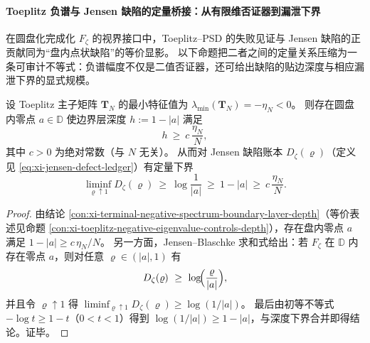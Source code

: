 \paragraph{Toeplitz 负谱与 Jensen 缺陷的定量桥接：从有限维否证器到漏泄下界}
在圆盘化完成化 \(F_\zeta\) 的视界接口中，Toeplitz--PSD 的失败见证与 Jensen 缺陷的正贡献同为“盘内点状缺陷”的等价显影。
以下命题把二者之间的定量关系压缩为一条可审计不等式：负谱幅度不仅是二值否证器，还可给出缺陷的贴边深度与相应漏泄下界的显式规模。

\begin{proposition}\label{prop:xi-toeplitz-negative-eigenvalue-implies-jensen-defect-lb}
设 Toeplitz 主子矩阵 \(\mathbf{T}_N\) 的最小特征值为 \(\lambda_{\min}(\mathbf{T}_N)=-\eta_N<0\)。
则存在圆盘内零点 \(a\in\mathbb{D}\) 使边界层深度 \(h:=1-|a|\) 满足
\[
h\ \ge\ c\,\frac{\eta_N}{N},
\]
其中 \(c>0\) 为绝对常数（与 \(N\) 无关）。
从而对 Jensen 缺陷账本 \(D_\zeta(\varrho)\)（定义见 \eqref{eq:xi-jensen-defect-ledger}）有定量下界
\[
\liminf_{\varrho\uparrow 1}D_\zeta(\varrho)\ \ge\ \log\!\frac{1}{|a|}\ \ge\ 1-|a|\ \ge\ c\,\frac{\eta_N}{N}.
\]
\end{proposition}

\begin{proof}
由结论 \ref{con:xi-terminal-negative-spectrum-boundary-layer-depth}（等价表述见命题 \ref{con:xi-toeplitz-negative-eigenvalue-controls-depth}），存在盘内零点 \(a\) 满足 \(1-|a|\ge c\,\eta_N/N\)。
另一方面，Jensen--Blaschke 求和式给出：若 \(F_\zeta\) 在 \(\mathbb{D}\) 内存在零点 \(a\)，则对任意 \(\varrho\in(|a|,1)\) 有
\[
D_\zeta(\varrho)\ \ge\ \log\!\Bigl(\frac{\varrho}{|a|}\Bigr),
\]
并且令 \(\varrho\uparrow 1\) 得 \(\liminf_{\varrho\uparrow 1}D_\zeta(\varrho)\ge \log(1/|a|)\)。
最后由初等不等式 \(-\log t\ge 1-t\)（\(0<t<1\)）得到 \(\log(1/|a|)\ge 1-|a|\)，与深度下界合并即得结论。证毕。
\end{proof}

\endinput


